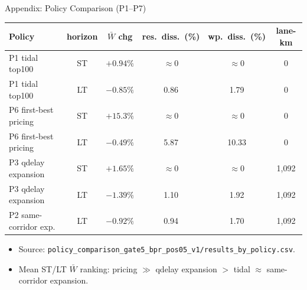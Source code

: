 \documentclass[11pt,aspectratio=169]{beamer}
\newcommand{\back}[1]{\hyperlink{#1}{\beamerreturnbutton{back}}}
\begin{document}
\begin{frame}[label=apppolicy]{Appendix: Policy Comparison (P1--P7)}
\scriptsize
\begin{center}
\begin{tabular}{lccccc}
\toprule
Policy & horizon & $\bar W$ chg & res.\ diss.\ (\%) & wp.\ diss.\ (\%) & lane-km \\
\midrule
P1 tidal top100 & ST & $+0.94\%$ & $\approx 0$ & $\approx 0$ & 0 \\
P1 tidal top100 & LT & $-0.85\%$ & 0.86 & 1.79 & 0 \\
P6 first-best pricing & ST & $+15.3\%$ & $\approx 0$ & $\approx 0$ & 0 \\
P6 first-best pricing & LT & $-0.49\%$ & 5.87 & 10.33 & 0 \\
P3 qdelay expansion & ST & $+1.65\%$ & $\approx 0$ & $\approx 0$ & 1{,}092 \\
P3 qdelay expansion & LT & $-1.39\%$ & 1.10 & 1.92 & 1{,}092 \\
P2 same-corridor exp. & LT & $-0.92\%$ & 0.94 & 1.70 & 1{,}092 \\
\bottomrule
\end{tabular}
\end{center}
\vspace{0.2em}
\begin{itemize}\footnotesize
  \item Source: \texttt{policy\_comparison\_gate5\_bpr\_pos05\_v1/results\_by\_policy.csv}.
  \item Mean ST/LT $\bar W$ ranking: pricing $\gg$ qdelay expansion $>$ tidal $\approx$ same-corridor expansion.
\end{itemize}
\centering\back{result6}
\end{frame}
\end{document}

